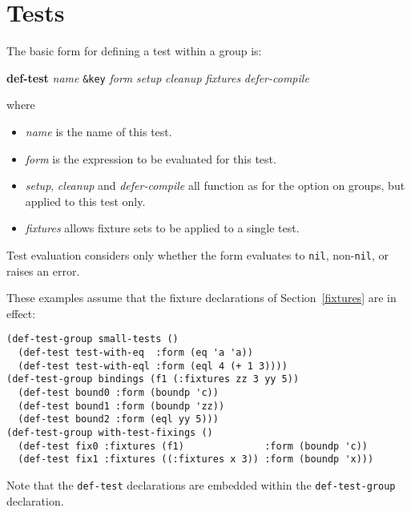 \documentclass{article}
\begin{document}
\section{Tests}
\label{tests}
The basic form for defining a
test within a group is:
\begin{center}
\textbf{def-test} \textit{name}
 \texttt{\&key} \textit{form} \textit{setup} \textit{cleanup} \textit{fixtures} \textit{defer-compile}
\end{center}
where
\begin{itemize}
\item\textit{name} is the name of this test.
\item\textit{form} is the expression to be evaluated for this test.
\item\textit{setup},
  \textit{cleanup} and
  \textit{defer-compile} all function as for the option on groups, but
  applied to this test only.
\item\textit{fixtures} allows
  fixture sets to be applied to a single test.
\end{itemize}
Test evaluation considers only whether the form evaluates to
\texttt{nil}, non-\texttt{nil}, or raises an error.

\label{first-test-use-of-fixtures}
These examples assume that the fixture declarations of
Section~\ref{fixtures} are in effect:
\begin{verbatim}
(def-test-group small-tests ()
  (def-test test-with-eq  :form (eq 'a 'a))
  (def-test test-with-eql :form (eql 4 (+ 1 3))))
(def-test-group bindings (f1 (:fixtures zz 3 yy 5))
  (def-test bound0 :form (boundp 'c))
  (def-test bound1 :form (boundp 'zz))
  (def-test bound2 :form (eql yy 5)))
(def-test-group with-test-fixings ()
  (def-test fix0 :fixtures (f1)              :form (boundp 'c))
  (def-test fix1 :fixtures ((:fixtures x 3)) :form (boundp 'x)))
\end{verbatim}
Note that the \texttt{def-test} declarations are embedded within the
\texttt{def-test-group} declaration.
\end{document}
